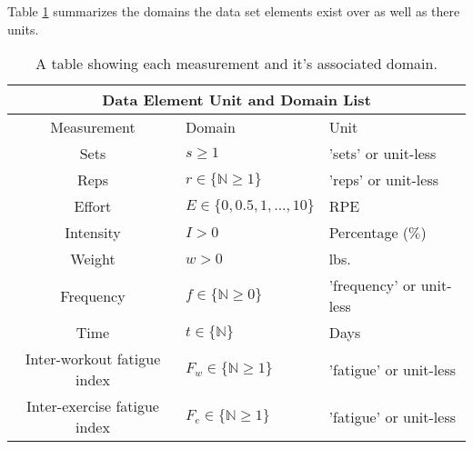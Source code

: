 

Table \ref{tab:DomainUnitTable} summarizes the domains the data set elements exist over as well as there units.

\begin{table}[h]
	\centering
    \begin{tabular}{|c|l|l|}
	    \hline
	    \multicolumn{3}{|c|}{Data Element Unit and Domain List} \\
	    \hline
        Measurement & Domain & Unit \\
        \hline
        Sets & $s\ge 1$ & 'sets' or unit-less\\
        Reps & $r\in \{ \mathbb{N} \ge 1 \}$ & 'reps' or unit-less \\
        Effort & $E\in \{0,0.5,1,...,10\}$ & RPE \\
        Intensity & $I>0$ & Percentage ($\%$) \\
        Weight & $w>0$ & lbs. \\
        Frequency & $f\in \{ \mathbb{N}\ge 0 \}$ & 'frequency' or unit-less \\
        Time & $t\in \{ \mathbb{N} \}$ & Days \\
        Inter-workout fatigue index & $F_w\in \{ \mathbb{N} \ge 1 \}$ & 'fatigue' or unit-less \\
        Inter-exercise fatigue index & $F_e\in \{ \mathbb{N} \ge 1 \}$ & 'fatigue' or unit-less \\
        \hline
    \end{tabular}
    \caption{A table showing each measurement and it's associated domain.}
    \label{tab:DomainUnitTable}
\end{table}